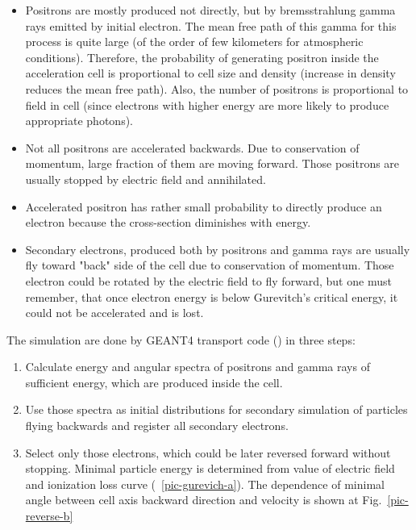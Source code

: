 \documentclass[utf8]{webofc}
\begin{document}
    \begin{itemize}
        \item Positrons are mostly produced not directly, but by bremsstrahlung gamma rays emitted by initial electron. The mean free path of this gamma for this process is quite large (of the order of few kilometers for atmospheric conditions). Therefore, the probability of generating positron inside the acceleration cell is proportional to cell size and density (increase in density reduces the mean free path). Also, the number of positrons is proportional to field in cell (since electrons with higher energy are more likely to produce appropriate photons).
        \item Not all positrons are accelerated backwards. Due to conservation of momentum, large fraction of them are moving forward. Those positrons are usually stopped by electric field and annihilated.
        \item Accelerated positron has rather small probability to directly produce an electron because the cross-section diminishes with energy.
        \item Secondary electrons, produced both by positrons and gamma rays are usually fly toward "back" side of the cell due to conservation of momentum. Those electron could be rotated by the electric field to fly forward, but one must remember, that once electron energy is below Gurevitch's critical energy, it could not be accelerated and is lost.
    \end{itemize}
    
    The simulation are done by GEANT4 transport code (\cite{ALLISON2016186}) in three steps:
    
    \begin{enumerate}
        \item Calculate energy and angular spectra of positrons and gamma rays of sufficient energy, which are produced inside the cell.
        \item Use those spectra as initial distributions for secondary simulation of particles flying backwards and register all secondary electrons.
        \item Select only those electrons, which could be later reversed forward without stopping. Minimal particle energy is determined from value of electric field and ionization loss curve (~\ref{pic-gurevich-a}). The dependence of minimal angle between cell axis backward direction and velocity is shown at Fig.~\ref{pic-reverse-b}
    \end{enumerate}
    
\end{document}
